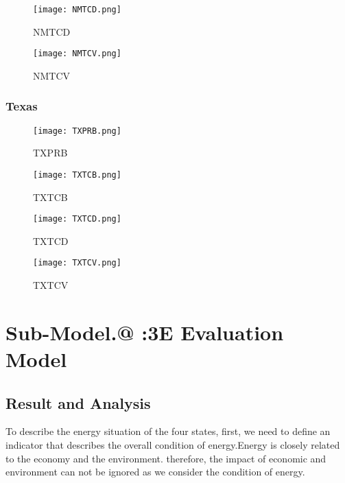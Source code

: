 \documentclass{mcmthesis}
\makeatletter
\newcommand{\Rmnum}[1]{\expandafter\@slowromancap\romannumeral #1@}
\makeatother
\begin{document}
\begin{figure}[H]
\begin{minipage}[htb]{0.5\textwidth}
\centering
\texttt{[image: NMTCD.png]}
\caption{NMTCD} \label{fig:NMTCD}
\end{minipage}
\begin{minipage}[htb]{0.5\textwidth}
\centering
\texttt{[image: NMTCV.png]}
\caption{NMTCV} \label{fig:NMTCV}
\end{minipage}
\end{figure}

\subsubsection{Texas}
\begin{figure}[H]
\begin{minipage}[htb]{0.5\textwidth}
\centering
\texttt{[image: TXPRB.png]}
\caption{TXPRB} \label{fig:TXPRB}
\end{minipage}
\begin{minipage}[htb]{0.5\textwidth}
\centering
\texttt{[image: TXTCB.png]}
\caption{TXTCB} \label{fig:TXTCB}
\end{minipage}
\end{figure}

\begin{figure}[H]
\begin{minipage}[htb]{0.5\textwidth}
\centering
\texttt{[image: TXTCD.png]}
\caption{TXTCD} \label{fig:TXTCD}
\end{minipage}
\begin{minipage}[htb]{0.5\textwidth}
\centering
\texttt{[image: TXTCV.png]}
\caption{TXTCV} \label{fig:TXTCV}
\end{minipage}
\end{figure}



\section{Sub-Model.\Rmnum{1} :\quad 3E Evaluation Model}
\subsection{Result and Analysis}
To describe the energy situation of the four states, first, we need to define an indicator that describes the overall condition of energy.Energy is closely related to the economy and the environment. therefore, the impact of economic and environment can not be ignored as we consider the condition of energy.
\end{document}
